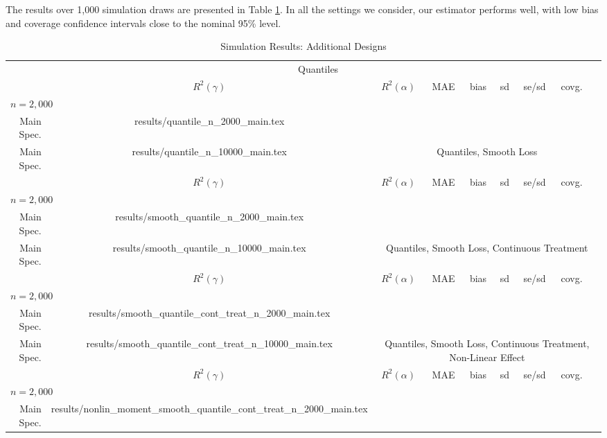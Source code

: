\documentclass[aos]{imsart}
\makeatletter
\numberwithin{equation}{section}
\theoremstyle{plain}
\theoremstyle{remark}
\newcommand\tableinput[1]{\@@input #1 }
\makeatother
\begin{document}
The results over 1,000 simulation draws are presented in Table \ref{tab:simul2}. In all the settings we consider, our estimator performs well, with low bias and coverage confidence intervals close to the nominal 95\% level.

\begin{table}[] \centering
    \caption{Simulation Results: Additional Designs}
    \label{tab:simul2}
    \begin{tabular}{r*{7}{c}}
    \toprule
    & \multicolumn{7}{c}{Quantiles} \\
    \cmidrule(r){2-8}
    & $R^2(\gamma)$ & $R^2(\alpha)$ & MAE & bias & sd & se/sd & covg. \\
    \midrule
    \multicolumn{8}{l}{$n = 2,000$} \\
    Main Spec. & \tableinput{results/quantile_n_2000_main.tex}
    
    \addlinespace
    \multicolumn{8}{l}{$n = 10,000$} \\
    Main Spec. & \tableinput{results/quantile_n_10000_main.tex}

    \addlinespace
    \midrule
    & \multicolumn{7}{c}{Quantiles, Smooth Loss} \\
    \cmidrule(r){2-8}
    & $R^2(\gamma)$ & $R^2(\alpha)$ & MAE & bias & sd & se/sd & covg. \\
    \midrule
    \multicolumn{8}{l}{$n = 2,000$} \\
    Main Spec. & \tableinput{results/smooth_quantile_n_2000_main.tex}
    
    \addlinespace
    \multicolumn{8}{l}{$n = 10,000$} \\
    Main Spec. & \tableinput{results/smooth_quantile_n_10000_main.tex}
    
    \addlinespace
    \midrule
        & \multicolumn{7}{c}{Quantiles, Smooth Loss, Continuous Treatment} \\
    \cmidrule(r){2-8}
    & $R^2(\gamma)$ & $R^2(\alpha)$ & MAE & bias & sd & se/sd & covg. \\
    \midrule
    \multicolumn{8}{l}{$n = 2,000$} \\
    Main Spec. & \tableinput{results/smooth_quantile_cont_treat_n_2000_main.tex}
    
    \addlinespace
    \multicolumn{8}{l}{$n = 10,000$} \\
    Main Spec. & \tableinput{results/smooth_quantile_cont_treat_n_10000_main.tex}

    \addlinespace
    \midrule
        & \multicolumn{7}{c}{Quantiles, Smooth Loss, Continuous Treatment, Non-Linear Effect} \\
    \cmidrule(r){2-8}
    & $R^2(\gamma)$ & $R^2(\alpha)$ & MAE & bias & sd & se/sd & covg. \\
    \midrule
    \multicolumn{8}{l}{$n = 2,000$} \\
    Main Spec. & \tableinput{results/nonlin_moment_smooth_quantile_cont_treat_n_2000_main.tex}
    

\end{tabular}
\end{table}
\end{document}
